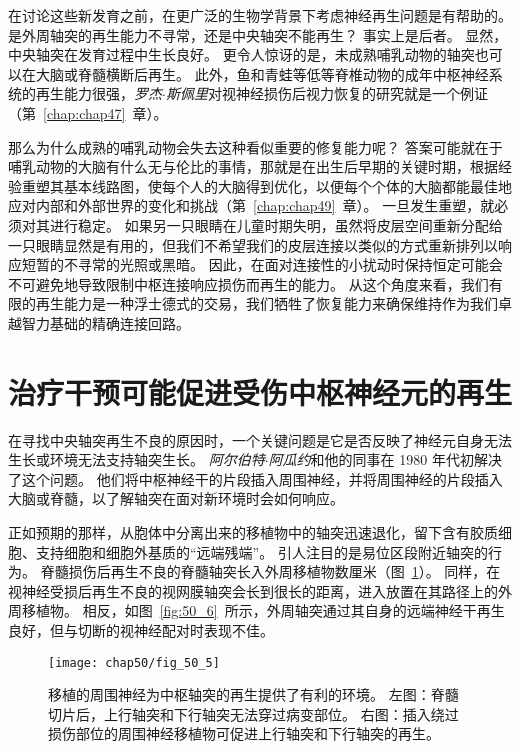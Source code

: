 在讨论这些新发育之前，在更广泛的生物学背景下考虑神经再生问题是有帮助的。
是外周轴突的再生能力不寻常，还是中央轴突不能再生？ 
事实上是后者。
显然，中央轴突在发育过程中生长良好。
更令人惊讶的是，未成熟哺乳动物的轴突也可以在大脑或脊髓横断后再生。
此外，鱼和青蛙等低等脊椎动物的成年中枢神经系统的再生能力很强，\textit{罗杰$\cdot$斯佩里}对视神经损伤后视力恢复的研究就是一个例证（第~\ref{chap:chap47}~章）。


那么为什么成熟的哺乳动物会失去这种看似重要的修复能力呢？
答案可能就在于哺乳动物的大脑有什么无与伦比的事情，那就是在出生后早期的关键时期，根据经验重塑其基本线路图，使每个人的大脑得到优化，以便每个个体的大脑都能最佳地应对内部和外部世界的变化和挑战（第~\ref{chap:chap49}~章）。
一旦发生重塑，就必须对其进行稳定。
如果另一只眼睛在儿童时期失明，虽然将皮层空间重新分配给一只眼睛显然是有用的，但我们不希望我们的皮层连接以类似的方式重新排列以响应短暂的不寻常的光照或黑暗。
因此，在面对连接性的小扰动时保持恒定可能会不可避免地导致限制中枢连接响应损伤而再生的能力。
从这个角度来看，我们有限的再生能力是一种浮士德式的交易，我们牺牲了恢复能力来确保维持作为我们卓越智力基础的精确连接回路。



\section{治疗干预可能促进受伤中枢神经元的再生}

在寻找中央轴突再生不良的原因时，一个关键问题是它是否反映了神经元自身无法生长或环境无法支持轴突生长。
\textit{阿尔伯特$\cdot$阿瓜约}和他的同事在 1980 年代初解决了这个问题。
他们将中枢神经干的片段插入周围神经，并将周围神经的片段插入大脑或脊髓，以了解轴突在面对新环境时会如何响应。


正如预期的那样，从胞体中分离出来的移植物中的轴突迅速退化，留下含有胶质细胞、支持细胞和细胞外基质的“远端残端”。
引人注目的是易位区段附近轴突的行为。
脊髓损伤后再生不良的脊髓轴突长入外周移植物数厘米（图~\ref{fig:50_5}）。
同样，在视神经受损后再生不良的视网膜轴突会长到很长的距离，进入放置在其路径上的外周移植物。
相反，如图~\ref{fig:50_6}~所示，外周轴突通过其自身的远端神经干再生良好，但与切断的视神经配对时表现不佳。


\begin{figure}[htbp]
	\centering
	\texttt{[image: chap50/fig\_50\_5]}
	\caption{移植的周围神经为中枢轴突的再生提供了有利的环境。
		左图：脊髓切片后，上行轴突和下行轴突无法穿过病变部位。
		右图：插入绕过损伤部位的周围神经移植物可促进上行轴突和下行轴突的再生\cite{david1981axonal}。}
	\label{fig:50_5}
\end{figure}


